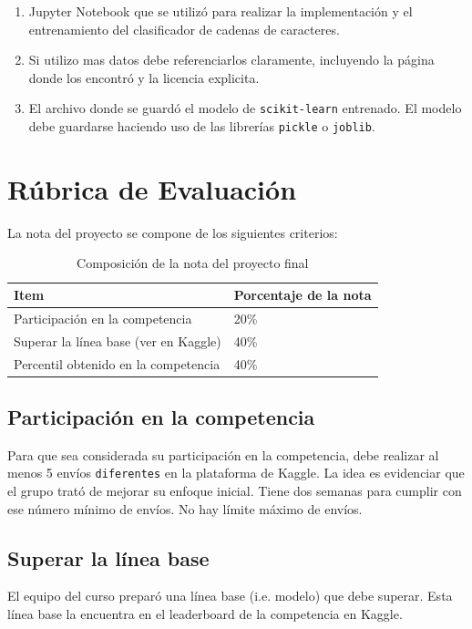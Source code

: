 \documentclass{article}
\begin{document}
\begin{enumerate}
    \item Jupyter Notebook que se utilizó para realizar la implementación y el entrenamiento del clasificador de cadenas de caracteres.
    \item Si utilizo mas datos debe referenciarlos claramente, incluyendo la página donde los encontró y la licencia explicita. 
    \item El archivo donde se guardó el modelo de \texttt{scikit-learn} entrenado. El modelo debe guardarse haciendo uso de las librerías \texttt{pickle} o \texttt{joblib}.
\end{enumerate}


\section{Rúbrica de Evaluación}
La nota del proyecto se compone de los siguientes criterios:

\begin{table}[H]
\begin{center}
\caption{Composición de la nota del proyecto final}
    \begin{tabular}{|l|l|}
    \hline
    \textbf{Item}                        & \textbf{Porcentaje de la nota} \\ \hline
    Participación en la competencia      & 20\%                         \\ \hline
    Superar la línea base  (ver en Kaggle)              & 40\%                         \\ \hline
    Percentil obtenido en la competencia & 40\%                         \\ \hline
    \end{tabular}
\end{center}
\end{table}

\subsection{Participación en la competencia}
Para que sea considerada su participación en la competencia, debe realizar al menos 5 envíos \texttt{diferentes} en la plataforma de Kaggle. La idea es evidenciar que el grupo trató de mejorar su enfoque inicial. Tiene dos semanas para cumplir con ese número mínimo de envíos. No hay límite máximo de envíos. 

\subsection{Superar la línea base}
El equipo del curso preparó una línea base (i.e. modelo) que debe superar. Esta línea base la encuentra en el leaderboard de la competencia en Kaggle. 
\end{document}
